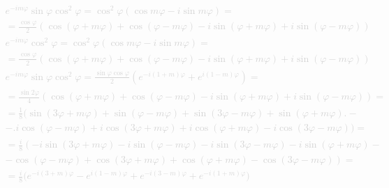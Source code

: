%
\textcolor{lightgray}{ \begin{equation*} \begin{aligned}
e^{-i m \varphi} \sin \varphi \cos^2 \varphi = \cos^2 \varphi
\left( \cos m \varphi - i \sin m \varphi \right) = \\ = \frac{\cos \varphi}{2} 
\left( \cos (\varphi + m \varphi) + \cos (\varphi - m \varphi) - 
i \sin (\varphi + m \varphi) + i \sin (\varphi - m \varphi) \right)
\end{aligned} \end{equation*} }
%
\textcolor{lightgray}{ \begin{equation*} \begin{aligned}
e^{-i m \varphi} \cos^2 \varphi = \cos^2 \varphi
\left( \cos m \varphi - i \sin m \varphi \right) = \\ = \frac{\cos \varphi}{2} 
\left( \cos (\varphi + m \varphi) + \cos (\varphi - m \varphi) - 
i \sin (\varphi + m \varphi) + i \sin (\varphi - m \varphi) \right)
\end{aligned} \end{equation*} }
%
\textcolor{lightgray}{ \begin{equation*} \begin{aligned}
e^{-i m \varphi} \sin \varphi \cos^2 \varphi = 
\frac{ \sin \varphi \cos \varphi } { 2 } 
\left( e^{-i (1+m) \varphi} + e^{i (1-m) \varphi} \right) = \\
= \frac{ \sin 2 \varphi } { 4 } 
\left( \cos (\varphi + m \varphi) + \cos (\varphi - m \varphi) - 
i \sin (\varphi + m \varphi) + i \sin (\varphi - m \varphi) \right) = \\
= \frac{1}{8} \big( \sin (3 \varphi + m \varphi) + 
\sin (\varphi - m \varphi) + \sin (3 \varphi - m \varphi) + 
\sin (\varphi + m \varphi) \big. - \\ 
- \big. i \cos (\varphi - m \varphi) + i \cos (3 \varphi + m \varphi) + 
i \cos (\varphi + m \varphi) - i \cos (3 \varphi - m \varphi) \big) = \\
= \frac{i}{8} \left( - i \sin (3 \varphi + m \varphi) - i 
\sin (\varphi - m \varphi) - i \sin (3 \varphi - m \varphi) - i 
\sin (\varphi + m \varphi) \right. - \\ 
- \left. \cos (\varphi - m \varphi) + \cos (3 \varphi + m \varphi) + 
\cos (\varphi + m \varphi) - \cos (3 \varphi - m \varphi) \right) = \\
= \frac{i}{8} \big( e^{-i (3+m) \varphi} - e^{i (1-m) \varphi} + 
e^{-i (3-m) \varphi} + e^{-i (1+m) \varphi} \big)
\end{aligned} \end{equation*} }
